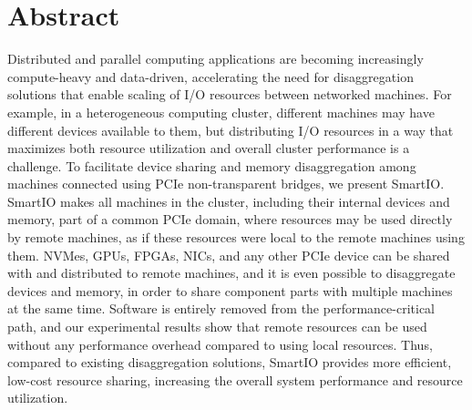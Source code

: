 \chapter{Abstract}
Distributed and parallel computing applications are becoming increasingly compute-heavy and data-driven, accelerating the need for disaggregation solutions that enable scaling of I/O resources between networked machines.
%
For example, in a heterogeneous computing cluster, different machines may have different devices available to them, but distributing I/O resources in a way that maximizes both resource utilization and overall cluster performance is a challenge.
%
To facilitate device sharing and memory disaggregation among machines connected using PCIe non-transparent bridges, we present SmartIO.
%
SmartIO makes all machines in the cluster, including their internal devices and memory, part of a common PCIe domain, where resources may be used directly by remote machines, as if these resources were local to the remote machines using them.
%
NVMes, GPUs, FPGAs, NICs, and any other PCIe device can be shared with and distributed to remote machines, and it is even possible to disaggregate devices and memory, in order to share component parts with multiple machines at the same time.
%
Software is entirely removed from the performance-critical path, and our experimental results show that remote resources can be used without any performance overhead compared to using local resources.
%
Thus, compared to existing disaggregation solutions, SmartIO provides more efficient, low-cost resource sharing, increasing the overall system performance and resource utilization.

